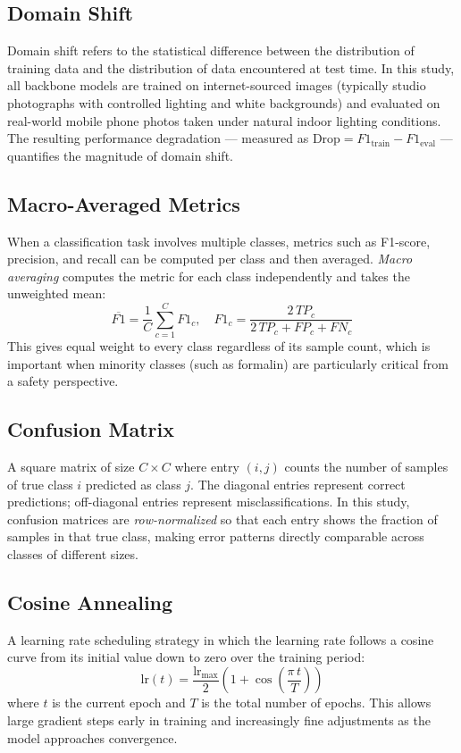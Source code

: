 \documentclass[12pt, a4paper]{article}
\begin{document}
\subsection{Domain Shift}

Domain shift refers to the statistical difference between the distribution
of training data and the distribution of data encountered at test time.
In this study, all backbone models are trained on internet-sourced
images (typically studio photographs with controlled lighting and
white backgrounds) and evaluated on real-world mobile phone photos
taken under natural indoor lighting conditions.
The resulting performance degradation --- measured as
$\text{Drop} = F1_\text{train} - F1_\text{eval}$ --- quantifies
the magnitude of domain shift.

\subsection{Macro-Averaged Metrics}

When a classification task involves multiple classes, metrics such as
F1-score, precision, and recall can be computed per class and then
averaged.
\textit{Macro averaging} computes the metric for each class independently
and takes the unweighted mean:
\[
  \overline{F1} = \frac{1}{C} \sum_{c=1}^{C} F1_c,
  \quad
  F1_c = \frac{2\,TP_c}{2\,TP_c + FP_c + FN_c}
\]
This gives equal weight to every class regardless of its sample count,
which is important when minority classes (such as formalin) are
particularly critical from a safety perspective.

\subsection{Confusion Matrix}

A square matrix of size $C \times C$ where entry $(i, j)$ counts
the number of samples of true class $i$ predicted as class $j$.
The diagonal entries represent correct predictions; off-diagonal entries
represent misclassifications.
In this study, confusion matrices are \textit{row-normalized} so that
each entry shows the fraction of samples in that true class, making
error patterns directly comparable across classes of different sizes.

\subsection{Cosine Annealing}

A learning rate scheduling strategy in which the learning rate follows
a cosine curve from its initial value down to zero over the training
period:
\[
  \text{lr}(t) = \frac{\text{lr}_\text{max}}{2}
  \left(1 + \cos\!\left(\frac{\pi\, t}{T}\right)\right)
\]
where $t$ is the current epoch and $T$ is the total number of epochs.
This allows large gradient steps early in training and increasingly
fine adjustments as the model approaches convergence.
\end{document}
